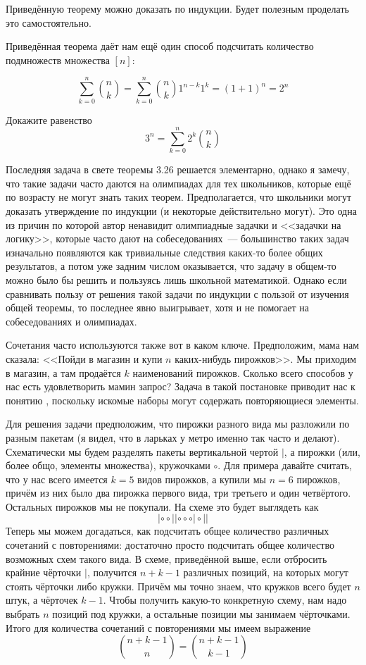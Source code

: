 \begin{exercise}
Приведённую теорему можно доказать по индукции. Будет полезным проделать это самостоятельно.
\end{exercise}

Приведённая теорема даёт нам ещё один способ подсчитать количество подмножеств множества $[n]$:

$$\sum_{k=0}^n {n \choose k} = \sum_{k=0}^n {n \choose k}1^{n-k}1^k = (1+1)^n = 2^n$$

\begin{exercise}
Докажите равенство
$$3^n = \sum_{k=0}^{n} 2^k {n \choose k}$$
\end{exercise}

Последняя задача в свете теоремы 3.26 решается элементарно, однако я замечу, что такие задачи часто даются на олимпиадах для тех школьников, которые ещё по возрасту не могут знать таких теорем. Предполагается, что школьники могут доказать утверждение по индукции (и некоторые действительно могут). Это одна из причин по которой автор ненавидит олимпиадные задачки и <<задачки на логику>>, которые часто дают на собеседованиях~--- большинство таких задач изначально появляются как тривиальные следствия каких-то более общих результатов, а потом уже задним числом оказывается, что задачу в общем-то можно было бы решить и пользуясь лишь школьной математикой. Однако если сравнивать пользу от решения такой задачи по индукции с пользой от изучения общей теоремы, то последнее явно выигрывает, хотя и не помогает на собеседованиях и олимпиадах.

Сочетания часто используются также вот в каком ключе. Предположим, мама нам сказала: <<Пойди в магазин и купи $n$ каких-нибудь пирожков>>. Мы приходим в магазин, а там продаётся $k$ наименований пирожков. Сколько всего способов у нас есть удовлетворить мамин запрос? Задача в такой постановке приводит нас к понятию , поскольку искомые наборы могут содержать повторяющиеся элементы.

Для решения задачи предположим, что пирожки разного вида мы разложили по разным пакетам (я видел, что в ларьках у метро именно так часто и делают). Схематически мы будем разделять пакеты вертикальной чертой $|$, а пирожки (или, более общо, элементы множества), кружочками $\circ$. Для примера давайте считать, что у нас всего имеется $k=5$ видов пирожков, а купили мы $n=6$ пирожков, причём из них было два пирожка первого вида, три третьего и один четвёртого. Остальных пирожков мы не покупали. На схеме это будет выглядеть как
$$|\circ\circ||\circ\circ\circ|\circ||$$
Теперь мы можем догадаться, как подсчитать общее количество различных сочетаний с повторениями: достаточно просто подсчитать общее количество возможных схем такого вида. В схеме, приведённой выше, если отбросить крайние чёрточки $|$, получится $n+k-1$ различных позиций, на которых могут стоять чёрточки либо кружки. Причём мы точно знаем, что кружков всего будет $n$ штук, а чёрточек $k-1$. Чтобы получить какую-то конкретную схему, нам надо выбрать $n$ позиций под кружки, а остальные позиции мы занимаем чёрточками. Итого для количества сочетаний с повторениями мы имеем выражение
$${n+k-1 \choose n} = {n+k-1\choose k - 1}$$

